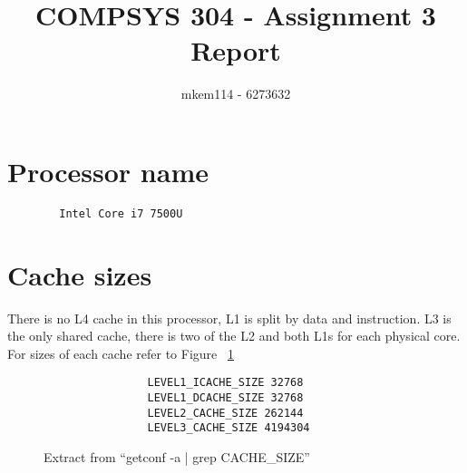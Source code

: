 \documentclass[10pt,a4paper,oneside]{article}
\author{mkem114 - 6273632}
\title{COMPSYS 304 - Assignment 3 Report}
\begin{document}
    \maketitle

    \section*{Processor name}
    \begin{verbatim}
        Intel Core i7 7500U
    \end{verbatim}

    \section*{Cache sizes}
    There is no L4 cache in this processor, L1 is split by data and instruction. L3 is the only shared cache, there is two of the L2 and both L1s for each physical core. For sizes of each cache refer to Figure ~\ref{cachesize}
    \begin{figure}[h!]
        \begin{mdframed}
            \begin{verbatim}
                LEVEL1_ICACHE_SIZE 32768
                LEVEL1_DCACHE_SIZE 32768
                LEVEL2_CACHE_SIZE 262144
                LEVEL3_CACHE_SIZE 4194304
            \end{verbatim}
        \end{mdframed}
        \caption{Extract from ``getconf -a | grep CACHE\_SIZE''}
        \label{cachesize}
    \end{figure}
\end{document}
